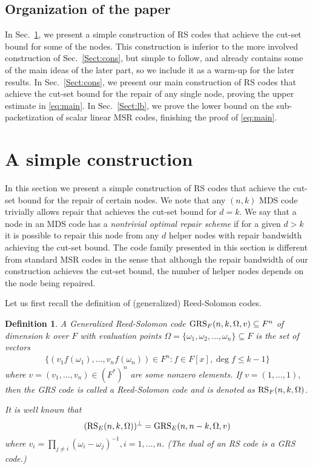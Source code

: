 \documentclass[11pt,onecolumn]{IEEEtran}
\newtheorem{definition}{Definition}
\begin{document}
\subsection{Organization of the paper}
In Sec.~\ref{sect:warmup}, we present a {simple construction} of RS codes  that achieve the cut-set bound for some of the nodes. This
construction is inferior to the more involved construction of Sec.~\ref{Sect:cons}, but simple to follow, and already contains some
of the main ideas of the later part, so we include it as a warm-up for the later results. In Sec.~\ref{Sect:cons}, we
present our main construction of RS codes that achieve the cut-set bound for the repair of any single node, proving the upper estimate in \eqref{eq:main}. In Sec.~\ref{Sect:lb}, we prove the lower bound on the sub-packetization of scalar linear MSR codes, finishing the proof of \eqref{eq:main}.


\section{A simple construction}\label{sect:warmup}
In this section we present a simple construction of RS codes that achieve the cut-set bound for the repair of certain nodes. 
We note that any $(n,k)$ MDS code trivially allows repair that achieves the cut-set bound for $d=k$. We say that a node in an MDS code has a {\em nontrivial optimal repair scheme} if {for a given $d>k$} it is possible to repair this node from any $d$  helper nodes with repair bandwidth achieving the cut-set bound. 
The code family presented in this section is different from standard MSR codes in the sense that although the repair bandwidth of our construction achieves the cut-set bound, the number of helper nodes depends on the node being repaired.

Let us first recall the definition of (generalized) Reed-Solomon codes.
\begin{definition}
A \emph{Generalized Reed-Solomon code} $\text{\rm GRS}_F(n,k,\Omega,v)\subseteq F^n$ of dimension $k$ over $F$ 
with evaluation points $\Omega=\{\omega_1,\omega_2,\dots,\omega_n\}\subseteq F$  is the set of vectors
\begin{align*}
\{(v_1f(\omega_1),\dots,v_nf(\omega_n))\in F^n:f\in F[x], \deg f\le k-1\}
\end{align*}
where $v=(v_1,\dots,v_n)\in (F^\ast)^n$ are some nonzero elements. If $v=(1,\dots,1),$ then the GRS code is called
a Reed-Solomon code and is denoted as $\text{\rm RS}_F(n,k,\Omega)$.

It is well known \cite[p.304]{MacWilliams77} that 
   \begin{equation}\label{eq:grs}
    (\text{\rm RS}_E(n,k,\Omega))^\bot=\text{\rm GRS}_E(n,n-k,\Omega,v)
  \end{equation}
where $v_i=\prod_{j\ne i}(\omega_i-\omega_j)^{-1}, i=1,\dots,n$. (The dual of an RS code is a GRS code.)  
\end{definition}   
\end{document}
